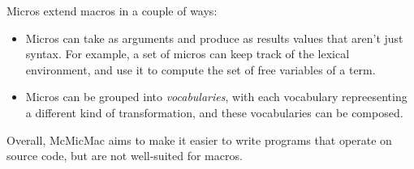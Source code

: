 Micros extend macros in a couple of ways:
\begin{itemize}
  \item Micros can take as arguments and produce as results values
    that aren't just syntax. For example, a set of micros can keep
    track of the lexical environment, and use it to compute the set of
    free variables of a term.
  \item Micros can be grouped into \emph{vocabularies}, with each
    vocabulary repreesenting a different kind of transformation, and
    these vocabularies can be composed.
\end{itemize}

Overall, McMicMac aims to make it easier to write programs that
operate on source code, but are not well-suited for macros.
